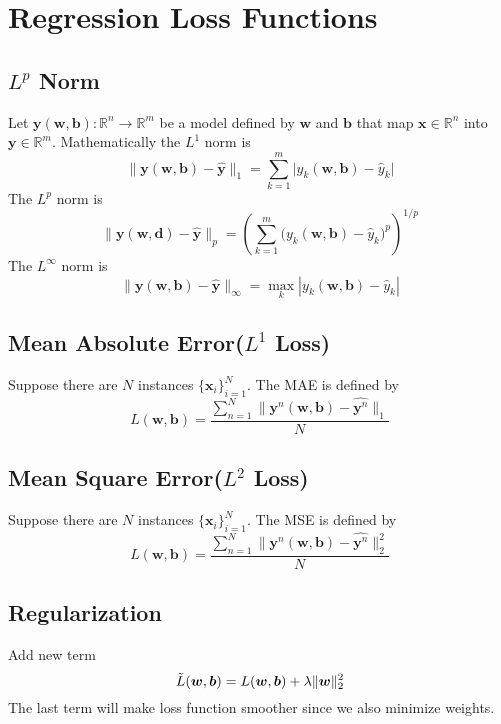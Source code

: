 \documentclass{article}
\begin{document}
    \section{Regression Loss Functions}
        \subsection{\texorpdfstring{$L^p$}{Lp} Norm}
            Let $\boldsymbol{y}(\boldsymbol{w},\boldsymbol{b}): \mathbb{R}^n \rightarrow \mathbb{R}^m$ be a model defined by $\boldsymbol{w}$ and $\boldsymbol{b}$ that map $\boldsymbol{x} \in \mathbb{R}^n$ into $\boldsymbol{y} \in \mathbb{R}^m$. Mathematically the $L^1$ norm is
            \[
                \| \boldsymbol{y}(\boldsymbol{w},\boldsymbol{b}) - \hat{\boldsymbol{y}} \|_1 = \sum_{k=1}^m \big| y_k(\boldsymbol{w},\boldsymbol{b}) - \hat{y}_k \big|
            \]
            The $L^p$ norm is
            \[
                \| \boldsymbol{y}(\boldsymbol{w},\boldsymbol{d}) - \hat{\boldsymbol{y}}\|_p = \left( \sum_{k=1}^m \big(y_k(\boldsymbol{w},\boldsymbol{b})-\hat{y}_k\big)^p \right)^{1/p}
            \]
            The $L^\infty$ norm is
            \[
                \| \boldsymbol{y}(\boldsymbol{w}, \boldsymbol{b}) - \hat{\boldsymbol{y}}\|_{\infty} = \max_{k} |y_k(\boldsymbol{w},\boldsymbol{b}) - \hat{y}_k|
            \]
        \subsection{Mean Absolute Error(\texorpdfstring{$L^1$}{L1} Loss)}
            Suppose there are $N$ instances $\{ \boldsymbol{x}_i \}_{i=1}^N$. The MAE is defined by
            \[
                L(\boldsymbol{w},\boldsymbol{b}) = \frac{\sum_{n=1}^N \| \boldsymbol{y}^n(\boldsymbol{w},\boldsymbol{b}) - \hat{\boldsymbol{y}^n} \|_1}{N}
            \]
        \subsection{Mean Square Error(\texorpdfstring{$L^2$}{L2} Loss)}
            Suppose there are $N$ instances $\{ \boldsymbol{x}_i \}_{i=1}^N$. The MSE is defined by
            \[
                L(\boldsymbol{w},\boldsymbol{b}) = \frac{\sum_{n=1}^N \| \boldsymbol{y}^n(\boldsymbol{w},\boldsymbol{b}) - \hat{\boldsymbol{y}^n}\|_2^2}{N}
            \]
        \subsection{Regularization}
            Add new term
            \[
                \Tilde{L}(\boldsymbol{w},\boldsymbol{b}) = L(\boldsymbol{w},\boldsymbol{b}) + \lambda \| \boldsymbol{w} \|_2^2
            \]
            The last term will make loss function smoother since we also minimize weights.
\end{document}
